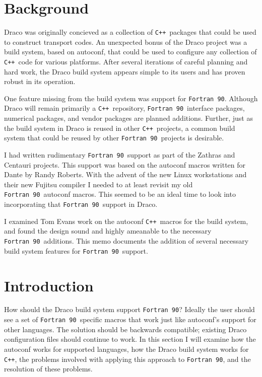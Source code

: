 \documentclass[11pt]{nmemo}
\newcommand{\fninety}{\texttt{Fortran~90}}
\newcommand{\cpp}{\texttt{C++}}
\begin{document}
\section{Background}

Draco was originally concieved as a collection of \cpp\ packages that
could be used to construct transport codes.  An unexpected bonus of
the Draco project was a build system, based on autoconf, that could be
used to configure any collection of \cpp\ code for various platforms.
After several iterations of careful planning and hard work, the Draco
build system appears simple to its users and has proven robust in its
operation.

One feature missing from the build system was support for \fninety.
Although Draco will remain primarily a \cpp\ repository, \fninety\
interface packages, numerical packages, and vendor packages are
planned additions.  Further, just as the build system in Draco is
reused in other \cpp\ projects, a common build system that could be
reused by other \fninety\ projects is desirable.

I had written rudimentary \fninety\ support as part of the Zathras and
Centauri projects.  This support was based on the autoconf macros
written for Dante by Randy Roberts.  With the advent of the new Linux
workstations and their new Fujitsu compiler I needed to at least
revisit my old \fninety\ autoconf macros.  This seemed to be an ideal
time to look into incorporating that \fninety\ support in Draco.

I examined Tom Evans work on the autoconf \cpp\ macros for the build
system, and found the design sound and highly ameanable to the
necessary \fninety\ additions.  This memo documents the addition of
several necessary build system features for \fninety\ support.

\newpage

\section{Introduction}

How should the Draco build system support \fninety?  Ideally the user
should see a set of \fninety\ specific macros that work just like
autoconf's support for other languages.  The solution should be
backwards compatible; existing Draco configuration files should
continue to work.  In this section I will examine how the autoconf
works for supported languages, how the Draco build system works for
\cpp, the problems involved with applying this approach to \fninety,
and the resolution of these problems.
\end{document}
